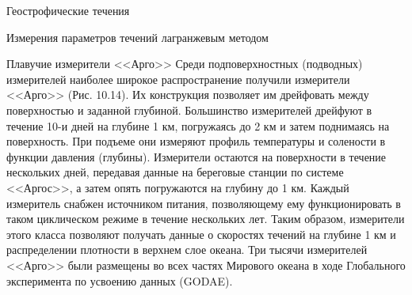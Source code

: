 \begin{chapter}{Геострофические течения}
\begin{section}{Измерения параметров течений лагранжевым методом}
\begin{paragraph}{Плавучие измерители <<Арго>>}
Среди подповерхностных (подводных) измерителей наиболее широкое
распространение получили измерители <<Арго>> (Рис. 10.14). Их
конструкция позволяет им дрейфовать между поверхностью и заданной
глубиной. Большинство измерителей дрейфуют в течение 10-и дней на
глубине 1 км, погружаясь до 2 км и затем поднимаясь на
поверхность. При подъеме они измеряют профиль температуры и солености
в функции давления (глубины). Измерители остаются на поверхности в
течение нескольких дней, передавая данные на береговые станции по
системе <<Аргос>>, а затем опять погружаются на глубину до 1 км. Каждый
измеритель снабжен источником питания, позволяющему ему
функционировать в таком циклическом режиме в течение нескольких
лет. Таким образом, измерители этого класса позволяют получать данные
о скоростях течений на глубине 1 км и распределении плотности в
верхнем слое океана. Три тысячи измерителей <<Арго>> были размещены во
всех частях Мирового океана в ходе Глобального эксперимента по
усвоению данных (GODAE).
%


\end{paragraph}
\end{section}
\end{chapter}
